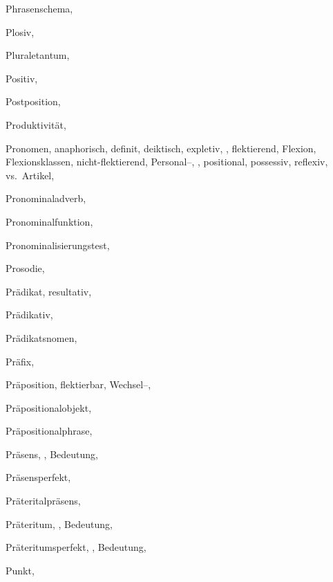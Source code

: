 \begin{theindex}
  \item Phrasenschema, 
  \item Plosiv, 
  \item Pluraletantum, 
  \item Positiv, 
  \item Postposition, 
  \item Produktivität, 
  \item Pronomen, 
    \subitem anaphorisch, 
    \subitem definit, 
    \subitem deiktisch, 
    \subitem expletiv, , 
    \subitem flektierend, 
    \subitem Flexion, 
    \subitem Flexionsklassen, 
    \subitem nicht-flektierend, 
    \subitem Personal--, , 
    \subitem positional, 
    \subitem possessiv, 
    \subitem reflexiv, 
    \subitem vs.\ Artikel, 
  \item Pronominaladverb, 
  \item Pronominalfunktion, 
  \item Pronominalisierungstest, 
  \item Prosodie, 
  \item Prädikat, 
    \subitem resultativ, 
  \item Prädikativ, 
  \item Prädikatsnomen, 
  \item Präfix, 
  \item Präposition, 
    \subitem flektierbar, 
    \subitem Wechsel--, 
  \item Präpositionalobjekt, 
  \item Präpositionalphrase, 
  \item Präsens, , 
    \subitem Bedeutung, 
  \item Präsensperfekt, 
  \item Präteritalpräsens, 
  \item Präteritum, , 
    \subitem Bedeutung, 
  \item Präteritumsperfekt, , 
    \subitem Bedeutung, 
  \item Punkt, 


\end{theindex}
